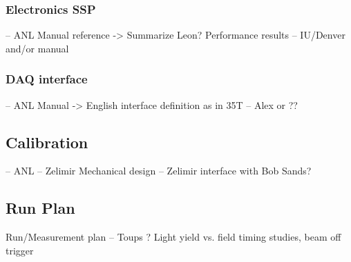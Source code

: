 \subsubsection{Electronics SSP}
      -- ANL Manual reference -> Summarize  Leon?
     Performance results -- IU/Denver and/or manual

\subsubsection{DAQ interface}
      -- ANL Manual -> English 
     interface definition as in 35T  -- Alex or ??

\subsection{Calibration} -- ANL -- Zelimir
     Mechanical design -- Zelimir interface with Bob Sands?

\subsection{Run Plan}
     Run/Measurement plan  -- Toups ?
     Light yield vs. field
     timing studies,
     beam off trigger




